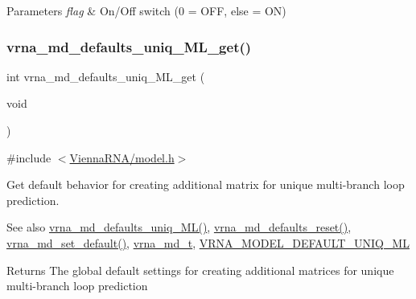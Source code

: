 \begin{DoxyParams}{Parameters}
{\em flag} & On/\+Off switch (0 = O\+FF, else = ON) \\
\hline
\end{DoxyParams}
\mbox{\label{group__model__details_gab48e70fd024bf838404bcbcca0c874a0}} 
\subsubsection{\texorpdfstring{vrna\_md\_defaults\_uniq\_ML\_get()}{vrna\_md\_defaults\_uniq\_ML\_get()}}
{\footnotesize\ttfamily int vrna\+\_\+md\+\_\+defaults\+\_\+uniq\+\_\+\+M\+L\+\_\+get (\begin{DoxyParamCaption}\item[{void}]{ }\end{DoxyParamCaption})}



{\ttfamily \#include $<$\mbox{\hyperlink{model_8h}{Vienna\+R\+N\+A/model.\+h}}$>$}



Get default behavior for creating additional matrix for unique multi-\/branch loop prediction. 

\begin{DoxySeeAlso}{See also}
\mbox{\hyperlink{group__model__details_ga59b944f61c5d2babec2d4c48c820de67}{vrna\+\_\+md\+\_\+defaults\+\_\+uniq\+\_\+\+M\+L()}}, \mbox{\hyperlink{group__model__details_ga70834424cf804d149937de89f80ceb45}{vrna\+\_\+md\+\_\+defaults\+\_\+reset()}}, \mbox{\hyperlink{group__model__details_ga8ac6ff84936282436f822644bf841f66}{vrna\+\_\+md\+\_\+set\+\_\+default()}}, \mbox{\hyperlink{group__model__details_ga1f8a10e12a0a1915f2a4eff0b28ea17c}{vrna\+\_\+md\+\_\+t}}, \mbox{\hyperlink{group__model__details_ga63f6006a02ba2d89148441f406c309e7}{V\+R\+N\+A\+\_\+\+M\+O\+D\+E\+L\+\_\+\+D\+E\+F\+A\+U\+L\+T\+\_\+\+U\+N\+I\+Q\+\_\+\+ML}} 
\end{DoxySeeAlso}
\begin{DoxyReturn}{Returns}
The global default settings for creating additional matrices for unique multi-\/branch loop prediction 
\end{DoxyReturn}
\mbox{\label{group__model__details_ga8dd29c55787a4576277e1907e92d810c}} 
